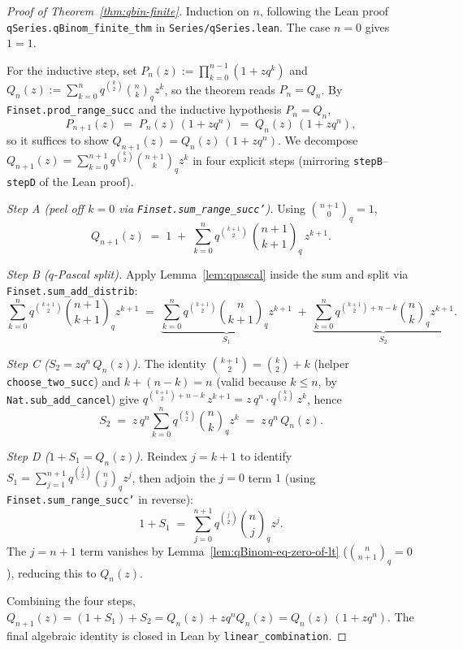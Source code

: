 \begin{proof}[Proof of Theorem~\ref{thm:qbin-finite}]\leanok{}
Induction on $n$, following the Lean proof
\texttt{qSeries.qBinom\_finite\_thm} in \texttt{Series/qSeries.lean}.
The case $n = 0$ gives $1 = 1$.

For the inductive step, set
$P_n(z) := \prod_{k=0}^{n-1}(1 + z q^k)$ and
$Q_n(z) := \sum_{k=0}^{n} q^{\binom{k}{2}}\binom{n}{k}_q z^k$,
so the theorem reads $P_n = Q_n$. By \texttt{Finset.prod\_range\_succ}
and the inductive hypothesis $P_n = Q_n$,
\[
  P_{n+1}(z) \;=\; P_n(z)\,(1 + z q^n) \;=\; Q_n(z)\,(1 + z q^n),
\]
so it suffices to show $Q_{n+1}(z) = Q_n(z)\,(1 + z q^n)$. We decompose
$Q_{n+1}(z) = \sum_{k=0}^{n+1} q^{\binom{k}{2}}\binom{n+1}{k}_q z^k$ in
four explicit steps (mirroring \texttt{stepB}--\texttt{stepD} of the
Lean proof).

\emph{Step A (peel off $k = 0$ via \texttt{Finset.sum\_range\_succ'}).}
Using $\binom{n+1}{0}_q = 1$,
\[
  Q_{n+1}(z) \;=\; 1 \;+\; \sum_{k=0}^{n} q^{\binom{k+1}{2}}\,\binom{n+1}{k+1}_q\,z^{k+1}.
\]

\emph{Step B ($q$-Pascal split).} Apply Lemma~\ref{lem:qpascal}
inside the sum and split via \texttt{Finset.sum\_add\_distrib}:
\[
  \sum_{k=0}^{n} q^{\binom{k+1}{2}}\binom{n+1}{k+1}_q z^{k+1}
    \;=\; \underbrace{\sum_{k=0}^{n} q^{\binom{k+1}{2}}\binom{n}{k+1}_q z^{k+1}}_{S_1}
       \;+\; \underbrace{\sum_{k=0}^{n} q^{\binom{k+1}{2}+n-k}\binom{n}{k}_q z^{k+1}}_{S_2}.
\]

\emph{Step C ($S_2 = z q^n\, Q_n(z)$).} The identity
$\binom{k+1}{2} = \binom{k}{2} + k$ (helper
\texttt{choose\_two\_succ}) and $k + (n - k) = n$ (valid because
$k \leq n$, by \texttt{Nat.sub\_add\_cancel}) give
$q^{\binom{k+1}{2}+n-k}\, z^{k+1} = z\, q^n \cdot q^{\binom{k}{2}}\, z^k$, hence
\[
  S_2 \;=\; z\, q^n \sum_{k=0}^{n} q^{\binom{k}{2}}\binom{n}{k}_q z^k \;=\; z\, q^n\, Q_n(z).
\]

\emph{Step D ($1 + S_1 = Q_n(z)$).} Reindex $j = k+1$ to identify
$S_1 = \sum_{j=1}^{n+1} q^{\binom{j}{2}}\binom{n}{j}_q z^j$, then
adjoin the $j = 0$ term $1$ (using \texttt{Finset.sum\_range\_succ'}
in reverse):
\[
  1 + S_1 \;=\; \sum_{j=0}^{n+1} q^{\binom{j}{2}}\binom{n}{j}_q z^j.
\]
The $j = n+1$ term vanishes by Lemma~\ref{lem:qBinom-eq-zero-of-lt}
($\binom{n}{n+1}_q = 0$), reducing this to $Q_n(z)$.

Combining the four steps,
$Q_{n+1}(z) = (1 + S_1) + S_2 = Q_n(z) + z q^n Q_n(z) = Q_n(z)\,(1 + z q^n)$.
The final algebraic identity is closed in Lean by
\texttt{linear\_combination}. \qedhere
\end{proof}


